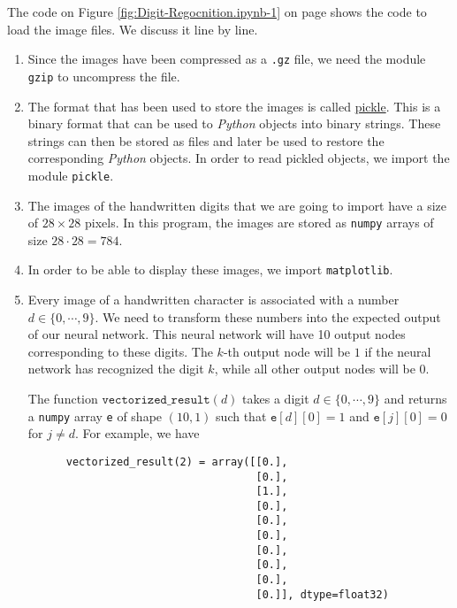 The code on Figure \ref{fig:Digit-Regocnition.ipynb-1} on page \pageref{fig:Digit-Regocnition.ipynb-1} shows the
code to load the image files.  We discuss it line by line.
\begin{enumerate}
\item Since the images have been compressed as a \texttt{.gz} file, we need the module \texttt{gzip} to
      uncompress the file.
\item The format that has been used to store the images is called
      \href{https://docs.python.org/3.6/library/pickle.html}{pickle}.
      This is a binary format that can be used to  \textsl{Python} objects into binary strings.  These
      strings can then be stored as files and later be used to restore the corresponding \textsl{Python} objects.  In order
      to read pickled objects, we import the module \texttt{pickle}.
\item The images of the handwritten digits that we are going to import have a size of $28 \times 28$ pixels.
      In this program, the images are stored as \texttt{numpy} arrays of size $28 \cdot 28 = 784$.
\item In order to be able to display these images, we import \texttt{matplotlib}.
\item Every image of a handwritten character is associated with a number $d \in \{0, \cdots, 9\}$.
      We need to transform these numbers into the expected output of our neural network.  This neural network
      will have 10 output nodes corresponding to these digits.  The $k$-th output node will be $1$
      if the neural network has recognized the digit $k$, while all other output nodes will be $0$.

      The function $\texttt{vectorized\_result}(d)$ takes a digit $d \in \{0,\cdots,9\}$ and returns a
      \texttt{numpy} array \texttt{e} of shape $(10, 1)$ such that $\texttt{e}[d][0]=1$ and $\texttt{e}[j][0]=0$ for
      $j\not=d$.  For example, we have
      \begin{verbatim}
      vectorized_result(2) = array([[0.],
                                    [0.],
                                    [1.],
                                    [0.],
                                    [0.],
                                    [0.],
                                    [0.],
                                    [0.],
                                    [0.],
                                    [0.]], dtype=float32)
      \end{verbatim}
      \vspace*{-0.5cm}
      

\end{enumerate}
